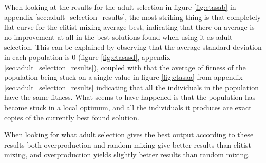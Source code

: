 When looking at the results for the adult selection in figure \ref{fig:ctasab} in appendix \ref{sec:adult_selection_results}, the most striking thing is that completely flat curve for the elitist mixing average best, indicating that there on average is no improvement at all in the best solutions found when using it as adult selection. This can be explained by observing that the average standard deviation in each population is 0 (figure \ref{fig:ctasasd}, appendix \ref{sec:adult_selection_results}), coupled with that the average of fitness of the population being stuck on a single value in figure \ref{fig:ctasaa} from appendix \ref{sec:adult_selection_results} indicating that all the individuals in the population have the same fitness. What seems to have happened is that the population has become stuck in a local optimum, and all the individuals it produces are exact copies of the currently best found solution.

When looking for what adult selection gives the best output according to these results both overproduction and random mixing give better results than elitist mixing, and overproduction yields slightly better results than random mixing.




